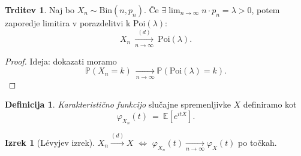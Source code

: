 \documentclass[11pt]{article}
\renewcommand{\P}{\mathbb{P}}
\newcommand{\E}{\mathbb{E}}
\theoremstyle{definition}
\newtheorem{definicija}{Definicija}[section]
\theoremstyle{definition}
\newtheorem{trditev}{Trditev}[section]
\theoremstyle{definition}
\newtheorem{izrek}{Izrek}[section]
\theoremstyle{definition}
\begin{document}
\begin{trditev}

Naj bo $X_n \sim \text{Bin}(n,p_n)$. Če $\exists \lim_{n \rightarrow \infty} n \cdot p_n = \lambda > 0$, potem zaporedje limitira v porazdelitvi k $\text{Poi}(\lambda)$:
$$X_n ~\xrightarrow[n \rightarrow \infty]{(d)}~ \text{Poi}(\lambda).$$

\begin{proof}
Ideja: dokazati moramo 
$$\P(X_n = k) ~\xrightarrow[n \rightarrow \infty]~ \P(\text{Poi}(\lambda) = k).$$
\end{proof}

\end{trditev}
\vspace{0.5cm}

\begin{definicija}

\textit{Karakteristično funkcijo} slučajne spremenljivke $X$ definiramo kot
$$\varphi_{X_n}(t) ~=~ \E[e^{itX}].$$

\end{definicija}
\vspace{0.5cm}

\begin{izrek}[L\'evyjev izrek]

$X_n \xrightarrow{(d)} X$ $\iff$ $\varphi_{X_n}(t) \xrightarrow[n \rightarrow \infty]~ \varphi_X(t)$ po točkah.

\end{izrek}
\vspace{0.5cm}


\pagebreak

\end{document}
